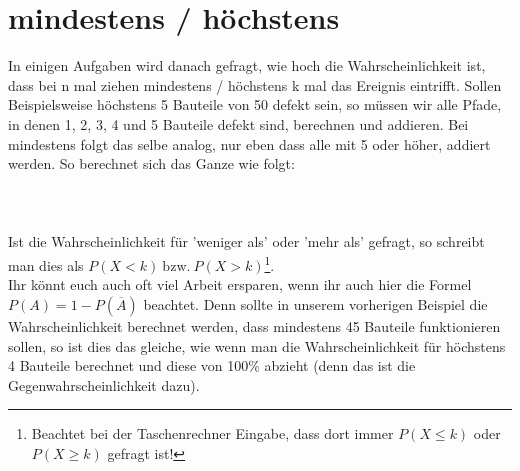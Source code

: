 \section{mindestens / höchstens}
	In einigen Aufgaben wird danach gefragt, wie hoch die Wahrscheinlichkeit ist,
	dass bei n mal ziehen mindestens / höchstens k mal das Ereignis eintrifft.
	Sollen Beispielsweise höchstens 5 Bauteile von 50 defekt sein, so müssen wir
	alle Pfade, in denen 1, 2, 3, 4 und 5 Bauteile defekt sind, berechnen und
	addieren. Bei mindestens folgt das selbe analog, nur eben dass alle mit 5 oder
	höher, addiert werden. So berechnet sich das Ganze wie folgt:
	\\ \\
	\formel{\[\mathrm{\underline{Höchstens}: }P(X\leq k)=P(X=0)+P(X=1)+\ldots
	+P(X=k)\]
	\[\mathrm{\underline{Mindestens}: }P(X\geq k)=P(X=k)+P(X=k+1)+\ldots+P(X=n)\]}
	\\ \\
	Ist die Wahrscheinlichkeit für 'weniger als' oder 'mehr als' gefragt, so
	schreibt man dies als \(P(X<k)\mathrm{\ bzw.\ }P(X>k)\)\footnote{Beachtet bei
	der Taschenrechner Eingabe, dass dort immer $P(X\leq k)$ oder $P(X\geq k)$
	gefragt ist!}.\\
	Ihr könnt euch auch oft viel Arbeit ersparen, wenn ihr auch hier die Formel
	\(P(A)=1-P(\overline{A})\) beachtet. Denn sollte in unserem vorherigen Beispiel
	die Wahrscheinlichkeit berechnet werden, dass mindestens 45 Bauteile
	funktionieren sollen, so ist dies das gleiche, wie wenn man die
	Wahrscheinlichkeit für höchstens 4 Bauteile berechnet und diese von 100\%
	abzieht (denn das ist die Gegenwahrscheinlichkeit dazu).
